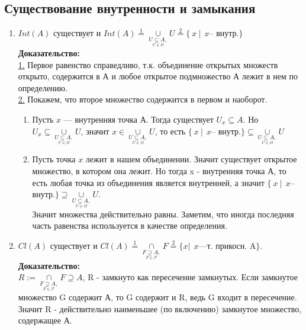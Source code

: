\documentclass[10pt]{report}
\begin{document}
\begin{spacing}{1.5}
\subsection{Существование внутренности и замыкания}
\begin{enumerate}
\item $Int(A)$ существует и $Int(A)\overset{1}{=}\underset{\underset{U\in\Omega}{U\subseteq A,}}{\cup}U\overset{2}{=}\lbrace ~x~ |~~x$-- внутр.$\rbrace$
\\
\textbf{Доказательство:}
\\ \underline{1.} Первое равенство справедливо, т.к. объединение открытых множеств открыто, содержится в А и любое открытое подмножество А лежит в нем по определению.
\\ \underline{2.} Покажем, что второе множество содержится в первом и наоборот.
\begin{enumerate}
\item Пусть $x$ --- внутренняя точка А. Тогда существует $U_{x}\subseteq A$. Но $U_{x}\subseteq \underset{\underset{U\in\Omega}{U\subseteq A,}}{\cup}U$, значит $x\in \underset{\underset{U\in\Omega}{U\subseteq A,}}{\cup}U$, то есть $\lbrace ~x~ |~~x$-- внутр.$\rbrace\subseteq \underset{\underset{U\in\Omega}{U\subseteq A,}}{\cup}U$
\item Пусть точка $x$ лежит в нашем объединении. Значит существует открытое множество, в котором она лежит. Но тогда x - внутренняя точка А, то есть любая точка из объединения является внутренней, а значит $\lbrace ~x~ |~~x$-- внутр.$\rbrace\supseteq \underset{\underset{U\in\Omega}{U\subseteq A,}}{\cup}U$.
\\Значит множества действительно равны. Заметим, что иногда последняя часть равенства используется в качестве определения.
\end{enumerate}
\item $Cl(A)$ существует и $Cl(A)\overset{1}{=}\underset{\underset{F\in\mathcal{F}}{ F\supseteq A,}}{\cap}F\overset{2}{=}\lbrace x|~~x$---т. прикосн. A$\rbrace$.
\\ \textbf{Доказательство:}
\\$R:=\underset{\underset{F\in\mathcal{F}}{ F\supseteq A,}}{\cap}F\supseteq A$, R - замкнуто как пересечение замкнутых. Если замкнутое множество G содержит А, то G содержит и R, ведь G входит в пересечение. Значит R - действительно наименьшее (по включению) замкнутое множество, содержащее А.
\end{enumerate}

\end{spacing}
\end{document}

